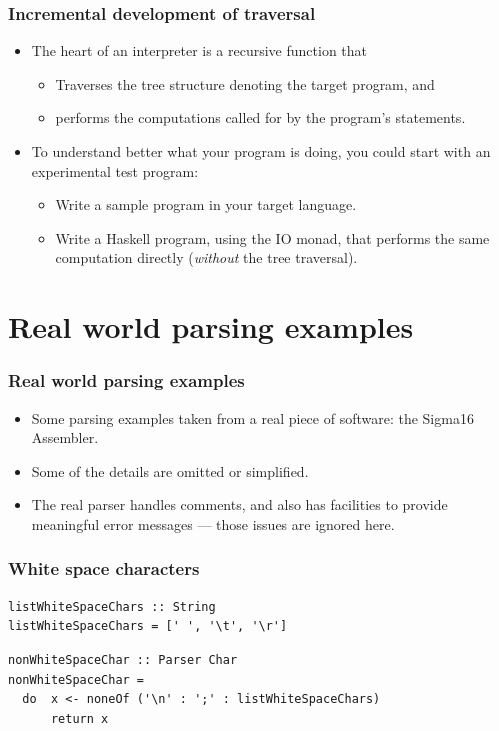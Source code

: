 \documentclass{beamer}
\begin{document}
\begin{frame}[fragile]
\frametitle{Incremental development of traversal}

\begin{itemize}
\item The heart of an interpreter is a recursive function that
  \begin{itemize}
  \item Traverses the tree structure denoting the target program, and
  \item performs the computations called for by the program's
    statements.
  \end{itemize}
\item To understand better what your program is doing, you could
  start with an experimental test program:
  \begin{itemize}
  \item Write a sample program in your target language.
  \item Write a Haskell program, using the IO monad, that performs
    the same computation directly (\emph{without} the tree
    traversal).
  \end{itemize}
\end{itemize}

\end{frame}

\section{Real world parsing examples}
\begin{frame}[fragile]
\frametitle{Real world parsing examples}

\begin{itemize}
\item Some parsing examples taken from a real piece of software:
  the Sigma16 Assembler.
\item Some of the details are omitted or simplified.
\item The real parser handles comments, and also has facilities to
  provide meaningful error messages --- those issues are ignored
  here.
\end{itemize}

\end{frame}

\begin{frame}[fragile]
\frametitle{White space characters}

\begin{verbatim}
listWhiteSpaceChars :: String
listWhiteSpaceChars = [' ', '\t', '\r']
\end{verbatim}

\begin{verbatim}
nonWhiteSpaceChar :: Parser Char
nonWhiteSpaceChar =
  do  x <- noneOf ('\n' : ';' : listWhiteSpaceChars)
      return x
\end{verbatim}

\end{frame}
\end{document}
